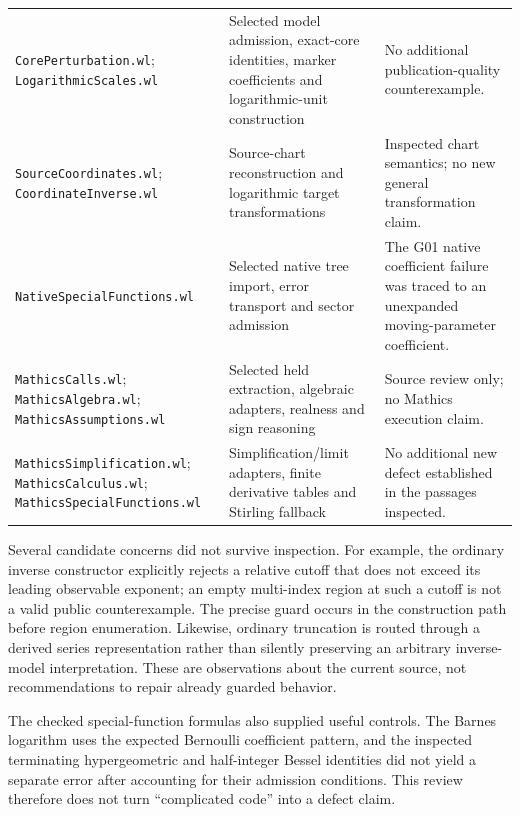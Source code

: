\documentclass[11pt,a4paper]{article}
\begin{document}
\begin{longtable}{@{}>{\raggedright\arraybackslash}p{}>{\raggedright\arraybackslash}p{}>{\raggedright\arraybackslash}p{}@{}}
\nolinkurl{CorePerturbation.wl};\newline
\nolinkurl{LogarithmicScales.wl} & Selected model admission, exact-core identities,
marker coefficients and logarithmic-unit construction & No additional
publication-quality counterexample.\\[5pt]
\nolinkurl{SourceCoordinates.wl};\newline
\nolinkurl{CoordinateInverse.wl} & Source-chart reconstruction and logarithmic
target transformations & Inspected chart semantics; no new general
transformation claim.\\[5pt]
\nolinkurl{NativeSpecialFunctions.wl} & Selected native tree import, error
transport and sector admission & The G01 native coefficient failure was traced
to an unexpanded moving-parameter coefficient.\\[5pt]
\nolinkurl{MathicsCalls.wl};\newline
\nolinkurl{MathicsAlgebra.wl};\newline
\nolinkurl{MathicsAssumptions.wl} & Selected held extraction, algebraic adapters,
realness and sign reasoning & Source review only; no Mathics execution claim.\\[5pt]
\nolinkurl{MathicsSimplification.wl};\newline
\nolinkurl{MathicsCalculus.wl};\newline
\nolinkurl{MathicsSpecialFunctions.wl} & Simplification/limit adapters,
finite derivative tables and Stirling fallback & No additional new defect
established in the passages inspected.\\
\bottomrule
\end{longtable}

Several candidate concerns did not survive inspection. For example, the
ordinary inverse constructor explicitly rejects a relative cutoff that does
not exceed its leading observable exponent; an empty multi-index region at
such a cutoff is not a valid public counterexample. The precise guard occurs
in the construction path before region enumeration. Likewise, ordinary
truncation is routed through a derived series representation rather than
silently preserving an arbitrary inverse-model interpretation.
These are observations about the current source, not recommendations to
repair already guarded behavior.\cite{core,seriesops}

The checked special-function formulas also supplied useful controls. The
Barnes logarithm uses the expected Bernoulli coefficient pattern, and the
inspected terminating hypergeometric and half-integer Bessel identities did
not yield a separate error after accounting for their admission conditions.
This review therefore does not turn ``complicated code'' into a defect claim.
\cite{barnes,identities,parameterized}
\end{document}
